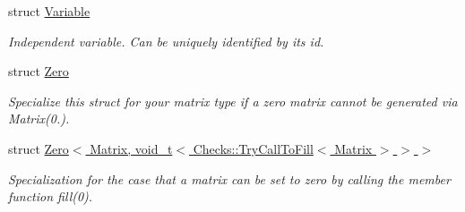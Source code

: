 \begin{DoxyCompactItemize}
struct \hyperlink{structFunG_1_1Variable}{Variable}
\begin{DoxyCompactList}\small\item\em Independent variable. Can be uniquely identified by its id. \end{DoxyCompactList}\item 
struct \hyperlink{structFunG_1_1Zero}{Zero}
\begin{DoxyCompactList}\small\item\em Specialize this struct for your matrix type if a zero matrix cannot be generated via Matrix(0.). \end{DoxyCompactList}\item 
struct \hyperlink{structFunG_1_1Zero_3_01Matrix_00_01void__t_3_01Checks_1_1TryCallToFill_3_01Matrix_01_4_01_4_01_4}{Zero$<$ Matrix, void\+\_\+t$<$ Checks\+::\+Try\+Call\+To\+Fill$<$ Matrix $>$ $>$ $>$}
\begin{DoxyCompactList}\small\item\em Specialization for the case that a matrix can be set to zero by calling the member function fill(0). \end{DoxyCompactList}\end{DoxyCompactItemize}
